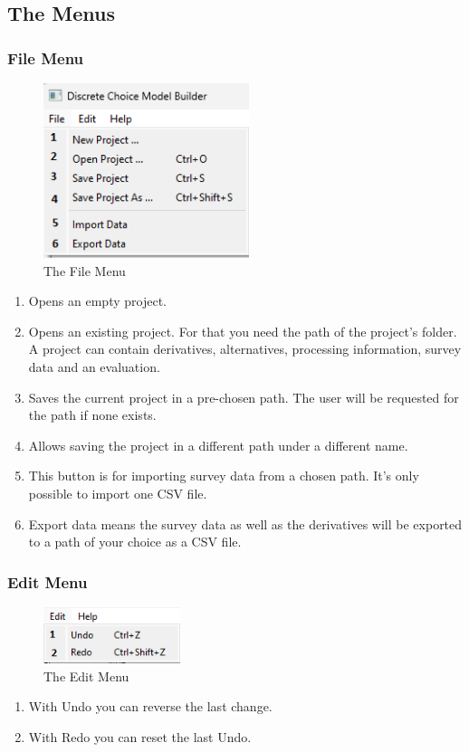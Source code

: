 \documentclass{article}
\begin{document}
\subsection{The Menus} \label{sec:menus}
\subsubsection{File Menu}
\begin{figure}[H]%
  \centering
  \includegraphics[width=6cm]{docs/User Manual/img/File Menu.png}
  \caption{The File Menu}
  \label{fig:filemenu}
\end{figure}
\begin{enumerate} [label=\textbf{\arabic*})]
    \item Opens an empty project.
    \item Opens an existing project. For that you need the path of the project's folder. A project can contain derivatives, alternatives, processing information, survey data and an evaluation.
    \item Saves the current project in a pre-chosen path. The user will be requested for the path if none exists.
    \item Allows saving the project in a different path under a different name.
    \item This button is for importing survey data from a chosen path. It's only possible to import one CSV file.
    \item Export data means the survey data as well as the derivatives will be exported to a path of your choice as a CSV file.
\end{enumerate}
\subsubsection{Edit Menu}
\begin{figure}[H]%
  \centering
  \includegraphics[width=4cm]{docs/User Manual/img/Edit Menu.png}
  \caption{The Edit Menu}
  \label{fig:editmenu} 
\end{figure}
\begin{enumerate} [label=\textbf{\arabic*})]
    \item With Undo you can reverse the last change.
    \item With Redo you can reset the last Undo.
\end{enumerate}
\end{document}
